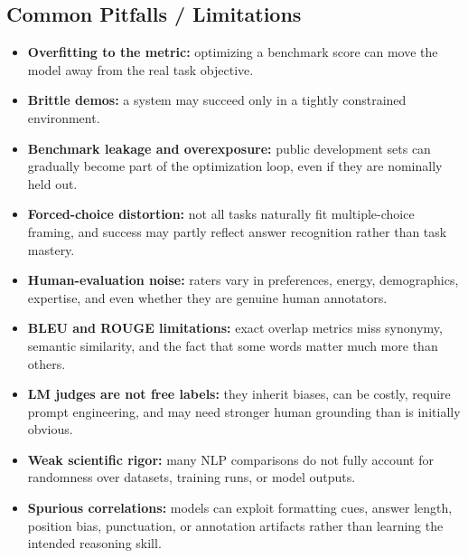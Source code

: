 \documentclass[11pt]{article}
\begin{document}
\subsection{Common Pitfalls / Limitations}
\begin{itemize}
    \item \textbf{Overfitting to the metric:} optimizing a benchmark score can move the model away from the real task objective.
    \item \textbf{Brittle demos:} a system may succeed only in a tightly constrained environment.
    \item \textbf{Benchmark leakage and overexposure:} public development sets can gradually become part of the optimization loop, even if they are nominally held out.
    \item \textbf{Forced-choice distortion:} not all tasks naturally fit multiple-choice framing, and success may partly reflect answer recognition rather than task mastery.
    \item \textbf{Human-evaluation noise:} raters vary in preferences, energy, demographics, expertise, and even whether they are genuine human annotators.
    \item \textbf{BLEU and ROUGE limitations:} exact overlap metrics miss synonymy, semantic similarity, and the fact that some words matter much more than others.
    \item \textbf{LM judges are not free labels:} they inherit biases, can be costly, require prompt engineering, and may need stronger human grounding than is initially obvious.
    \item \textbf{Weak scientific rigor:} many NLP comparisons do not fully account for randomness over datasets, training runs, or model outputs.
    \item \textbf{Spurious correlations:} models can exploit formatting cues, answer length, position bias, punctuation, or annotation artifacts rather than learning the intended reasoning skill.
\end{itemize}
\end{document}
